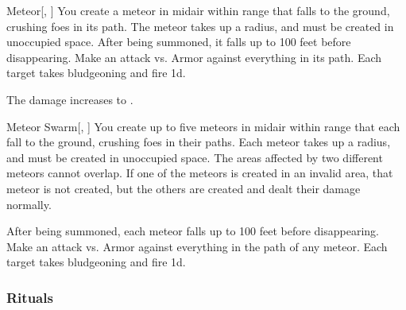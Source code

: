 \lowercase{\hypertarget{spell:Meteor}{}}\label{spell:Meteor}
\begin{freeability}[Rank 5]{\hypertarget{spell:Meteor}{Meteor}}[, ]
You create a meteor in midair within \rngmed range that falls to the ground, crushing foes in its path.
The meteor takes up a \areasmall radius, and must be created in unoccupied space.
After being summoned, it falls up to 100 feet before disappearing.
Make an attack vs. Armor against everything in its path.
\hit Each target takes bludgeoning and fire  \minus1d.

\rankline
{} The damage increases to .

\end{freeability}
\vspace{0.25em}



\lowercase{\hypertarget{spell:Meteor Swarm}{}}\label{spell:Meteor Swarm}
\begin{freeability}[Rank 8]{\hypertarget{spell:Meteor Swarm}{Meteor Swarm}}[, ]
You create up to five meteors in midair within \rnglong range that each fall to the ground, crushing foes in their paths.
Each meteor takes up a \areasmall radius, and must be created in unoccupied space.
The areas affected by two different meteors cannot overlap.
If one of the meteors is created in an invalid area, that meteor is not created, but the others are created and dealt their damage normally.

After being summoned, each meteor falls up to 100 feet before disappearing.
Make an attack vs. Armor against everything in the path of any meteor.
\hit Each target takes bludgeoning and fire  \minus1d.

\end{freeability}
\vspace{0.25em}



\subsubsection{Rituals}


